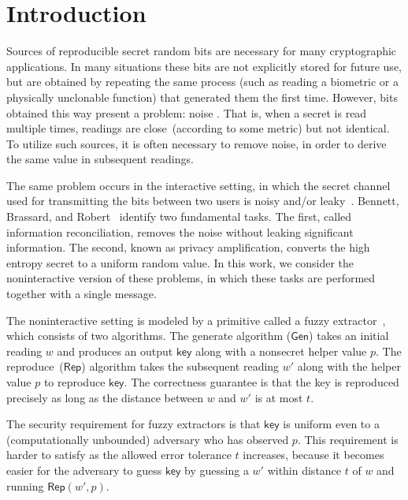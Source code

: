 \documentclass[11pt]{article}
\newcommand{\class}[1]{{\ensuremath{\mathsf{#1}}}}
\newcommand{\key}{\ensuremath{\class{key}}\xspace}
\newcommand{\gen}{\ensuremath{\class{Gen}}\xspace}
\newcommand{\rep}{\ensuremath{\class{Rep}}\xspace}
\begin{document}
\newpage

\section{Introduction}
Sources of reproducible secret random bits are necessary for many cryptographic applications.  In many situations these bits are not explicitly stored for future use, but are obtained by repeating the same process  (such as reading a biometric or a physically unclonable function) that generated them the first time.
However, bits obtained this way present a problem: noise \cite{daugman2004,zviran1993comparison,brostoff2000passfaces,ellison2000protecting,mayrhofer2009shake,monrose2002password,pappu2002physical,gassend2002silicon,tuyls2006puf,suh2007physical,bennett1988privacy}.  That is, when a secret is read multiple times, readings are close~(according to some metric) but not identical.  To utilize such sources, it is often necessary to remove noise, in order to derive the same value in subsequent readings.

The same problem occurs in the interactive setting, in which the secret channel used for transmitting the bits between two users is noisy and/or leaky~\cite{wyner1975wire}. Bennett, Brassard, and Robert~\cite{bennett1988privacy} identify two fundamental tasks.  The first, called information reconciliation, removes the noise without leaking significant information. The second, known as privacy amplification, converts the high entropy secret to a uniform random value.  In this work, we consider the noninteractive version of these problems, in which these tasks are performed together with a single message.

The noninteractive setting is modeled by a primitive called a fuzzy extractor~\cite{DBLP:journals/siamcomp/DodisORS08}, which consists of two algorithms.  %
The  generate algorithm ($\gen$)  takes an initial reading $w$ and produces an output $\key$ along with a nonsecret helper value $p$.  The reproduce~($\rep$) algorithm takes the subsequent reading $w'$ along with the helper value $p$ to reproduce $\key$.   The correctness guarantee is that the key is reproduced precisely as long as the distance between $w$ and $w'$ is at most $t$. 

The security requirement for fuzzy extractors is that $\key$ is uniform even to a (computationally unbounded) adversary who has observed $p$.   This requirement is  harder to satisfy as the allowed error tolerance $t$ increases, because it becomes easier for the adversary to guess $\key$ by guessing a $w'$ within distance $t$ of $w$ and running $\rep(w',p)$.
\end{document}
